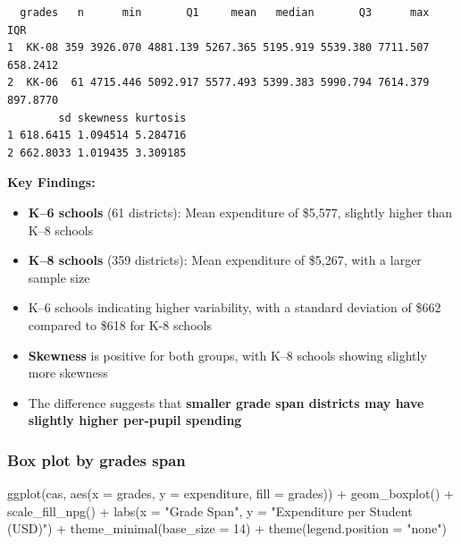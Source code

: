 \documentclass[
  12pt,
  letterpaper,
]{scrbook}
\newenvironment{Shaded}{\begin{snugshade}}{\end{snugshade}}
\newcommand{\AttributeTok}[1]{\textcolor[rgb]{0.40,0.45,0.13}{#1}}
\newcommand{\DecValTok}[1]{\textcolor[rgb]{0.68,0.00,0.00}{#1}}
\newcommand{\FunctionTok}[1]{\textcolor[rgb]{0.28,0.35,0.67}{#1}}
\newcommand{\NormalTok}[1]{\textcolor[rgb]{0.00,0.23,0.31}{#1}}
\newcommand{\SpecialCharTok}[1]{\textcolor[rgb]{0.37,0.37,0.37}{#1}}
\newcommand{\StringTok}[1]{\textcolor[rgb]{0.13,0.47,0.30}{#1}}
\providecommand{\tightlist}{%
  \setlength{\itemsep}{0pt}\setlength{\parskip}{0pt}}
\renewcommand{\tightlist}{\setlength{\itemsep}{0.5\baselineskip}\setlength{\parskip}{0.2\baselineskip}}
\theoremstyle{plain}
\theoremstyle{definition}
\theoremstyle{remark}
\begin{document}
\begin{verbatim}
  grades   n      min       Q1     mean   median       Q3      max      IQR
1  KK-08 359 3926.070 4881.139 5267.365 5195.919 5539.380 7711.507 658.2412
2  KK-06  61 4715.446 5092.917 5577.493 5399.383 5990.794 7614.379 897.8770
        sd skewness kurtosis
1 618.6415 1.094514 5.284716
2 662.8033 1.019435 3.309185
\end{verbatim}

\textbf{Key Findings:}

\begin{itemize}
\tightlist
\item
  \textbf{K--6 schools} (61 districts): Mean expenditure of {\$5,577,}
  slightly higher than K--8 schools
\item
  \textbf{K--8 schools} (359 districts): Mean expenditure of {\$5,267,}
  with a larger sample size
\item
  K--6 schools indicating higher variability, with a standard deviation
  of {\$662} compared to {\$618} for K-8 schools
\item
  \textbf{Skewness} is positive for both groups, with K--8 schools
  showing slightly more skewness
\item
  The difference suggests that \textbf{smaller grade span districts may
  have slightly higher per-pupil spending}
\end{itemize}

\subsubsection{Box plot by grades span}\label{box-plot-by-grades-span}

\begin{Shaded}
\begin{Highlighting}[]
\FunctionTok{ggplot}\NormalTok{(cas, }\FunctionTok{aes}\NormalTok{(}\AttributeTok{x =}\NormalTok{ grades, }\AttributeTok{y =}\NormalTok{ expenditure, }\AttributeTok{fill =}\NormalTok{ grades)) }\SpecialCharTok{+}
  \FunctionTok{geom\_boxplot}\NormalTok{() }\SpecialCharTok{+}
  \FunctionTok{scale\_fill\_npg}\NormalTok{() }\SpecialCharTok{+}
  \FunctionTok{labs}\NormalTok{(}\AttributeTok{x =} \StringTok{"Grade Span"}\NormalTok{,}
       \AttributeTok{y =} \StringTok{"Expenditure per Student (USD)"}\NormalTok{) }\SpecialCharTok{+}
  \FunctionTok{theme\_minimal}\NormalTok{(}\AttributeTok{base\_size =} \DecValTok{14}\NormalTok{) }\SpecialCharTok{+}
  \FunctionTok{theme}\NormalTok{(}\AttributeTok{legend.position =} \StringTok{"none"}\NormalTok{)}
\end{Highlighting}
\end{Shaded}
\end{document}
